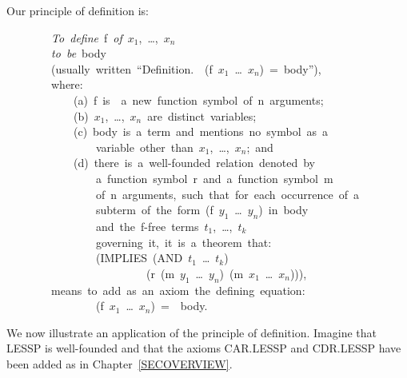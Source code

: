 \documentclass[11pt]{book}
\newenvironment{pubasis}{\begin{flushleft}\ttfamily\small}{\normalsize\rmfamily\end{flushleft}}
\newcommand{\pubinlineunderline}[1]{\emph{#1}}
\begin{document}
Our principle of definition is:
\begin{pubasis}
~~~~~~~~\pubinlineunderline{To~define}~f~\pubinlineunderline{of}~$x_{1}$,~\ldots{},~$x_{n}$\\
~~~~~~~~\pubinlineunderline{to~be}~body\\
~~~~~~~~(usually~written~``Definition.~~(f~$x_{1}$~\ldots{}~$x_{n}$)~=~body''),\\
~~~~~~~~where:\\

~~~~~~~~~~~~(a)~f~is~~a~new~function~symbol~of~n~arguments;\\

~~~~~~~~~~~~(b)~$x_{1}$,~\ldots{},~$x_{n}$~are~distinct~variables;\\

~~~~~~~~~~~~(c)~body~is~a~term~and~mentions~no~symbol~as~a\\
~~~~~~~~~~~~~~~~variable~other~than~$x_{1}$,~\ldots{},~$x_{n}$;~and\\

~~~~~~~~~~~~(d)~there~is~a~well-founded~relation~denoted~by\\
~~~~~~~~~~~~~~~~a~function~symbol~r~and~a~function~symbol~m\\
~~~~~~~~~~~~~~~~of~n~arguments,~such~that~for~each~occurrence~of~a\\
~~~~~~~~~~~~~~~~subterm~of~the~form~(f~$y_{1}$~\ldots{}~$y_{n}$)~in~body\\
~~~~~~~~~~~~~~~~and~the~f-free~terms~$t_{1}$,~\ldots{},~$t_{k}$\\
~~~~~~~~~~~~~~~~governing~it,~it~is~a~theorem~that:\\

~~~~~~~~~~~~~~~~(IMPLIES~(AND~$t_{1}$~\ldots{}~$t_{k}$)\\
~~~~~~~~~~~~~~~~~~~~~~~~~(r~(m~$y_{1}$~\ldots{}~$y_{n}$)~(m~$x_{1}$~\ldots{}~$x_{n}$))),\\

~~~~~~~~means~to~add~as~an~axiom~the~defining~equation:\\

~~~~~~~~~~~~~~~~(f~$x_{1}$~\ldots{}~$x_{n}$)~=~~body.\\
\end{pubasis}
\nopagebreak\par\hrulefill\nopagebreak\par
We now illustrate an application of the principle of definition.
Imagine that LESSP is well-founded and that the axioms CAR.LESSP
and CDR.LESSP have been added as in Chapter~\ref{SECOVERVIEW}.
\end{document}
